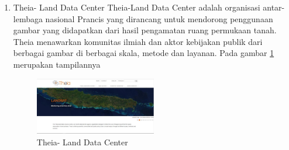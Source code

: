 \begin{enumerate}
\item Theia- Land Data Center
Theia-Land Data Center adalah organisasi antar-lembaga nasional Prancis yang dirancang untuk mendorong penggunaan gambar yang didapatkan dari hasil pengamatan ruang permukaan tanah. Theia menawarkan komunitas ilmiah dan aktor kebijakan publik dari berbagai gambar di berbagai skala, metode dan layanan.  Pada gambar \ref{labelgambar7} merupakan tampilannya  
\begin{figure}[ht]
\centering
\includegraphics[width=0.5\textwidth]{pictures/Theia_Land_Data_Center}
\caption{Theia- Land Data Center}
\label{labelgambar7}
\end{figure}
\end{enumerate}



